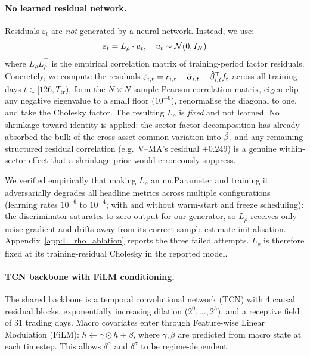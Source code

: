 \paragraph{No learned residual network.}
Residuals $\varepsilon_t$ are \emph{not} generated by a neural network. Instead, we use:
\begin{equation}
    \varepsilon_t = L_\rho \cdot u_t, \quad u_t \sim \mathcal{N}(0, I_N)
    \label{eq:shrunk_residual}
\end{equation}
where $L_\rho L_\rho^\top$ is the empirical correlation matrix of training-period factor residuals. Concretely, we compute the residuals $\tilde\varepsilon_{i,t} = r_{i,t} - \hat{\alpha}_{i,t} - \hat{\beta}_{i,t}^\top f_t$ across all training days $t \in [126, T_{\text{tr}})$, form the $N\times N$ sample Pearson correlation matrix, eigen-clip any negative eigenvalue to a small floor ($10^{-6}$), renormalise the diagonal to one, and take the Cholesky factor. The resulting $L_\rho$ is \emph{fixed} and not learned. No shrinkage toward identity is applied: the sector factor decomposition has already absorbed the bulk of the cross-asset common variation into $\hat{\beta}$, and any remaining structured residual correlation (e.g.\ V--MA's residual $+0.249$) is a genuine within-sector effect that a shrinkage prior would erroneously suppress.

We verified empirically that making $L_\rho$ an $\mathrm{nn.Parameter}$ and training it adversarially degrades all headline metrics across multiple configurations (learning rates $10^{-6}$ to $10^{-4}$; with and without warm-start and freeze scheduling): the discriminator saturates to zero output for our generator, so $L_\rho$ receives only noise gradient and drifts away from its correct sample-estimate initialisation. Appendix~\ref{app:L_rho_ablation} reports the three failed attempts. $L_\rho$ is therefore fixed at its training-residual Cholesky in the reported model.

\paragraph{TCN backbone with FiLM conditioning.}
The shared backbone is a temporal convolutional network (TCN) with 4 causal residual blocks, exponentially increasing dilation ($2^0,\ldots,2^3$), and a receptive field of 31 trading days. Macro covariates enter through Feature-wise Linear Modulation (FiLM): $h \leftarrow \gamma \odot h + \beta$, where $\gamma, \beta$ are predicted from macro state at each timestep. This allows $\delta^\alpha$ and $\delta^\sigma$ to be regime-dependent.

